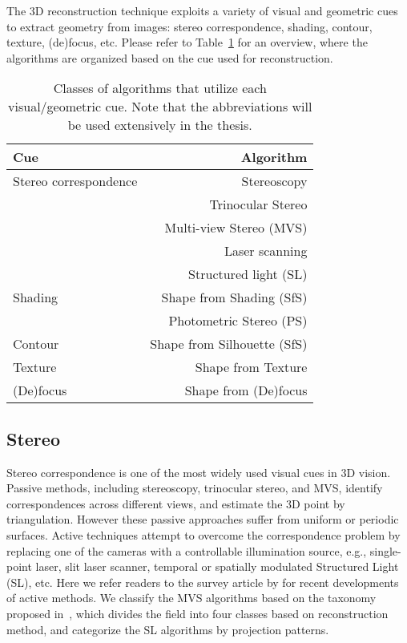 The 3D reconstruction technique exploits a variety of visual and geometric cues to extract geometry from images: stereo correspondence, shading, contour, texture, (de)focus, etc. Please refer to Table~\ref{tab:cue_algo} for an overview, where the algorithms are organized based on the cue used for reconstruction.
\begin{table}[h]
  \centering
  \begin{tabular}{l|r}
  \toprule
  \textbf{Cue} & \textbf{Algorithm}\\
  \midrule
  Stereo correspondence & Stereoscopy\\
  & Trinocular Stereo\\
  & Multi-view Stereo (MVS)\\
  & Laser scanning\\
  & Structured light (SL)\\
  \hline
  Shading & Shape from Shading (SfS)\\
  & Photometric Stereo (PS)\\
  \hline
  Contour & Shape from Silhouette (SfS)\\
  \hline
  Texture & Shape from Texture\\
  \hline
  (De)focus & Shape from (De)focus\\
  \bottomrule
  \end{tabular}
  \caption{Classes of algorithms that utilize each visual/geometric cue. Note that the abbreviations will be used extensively in the thesis.}
  \label{tab:cue_algo}
\end{table}

\subsection{Stereo}
Stereo correspondence is one of the most widely used visual cues in 3D vision. Passive methods, including stereoscopy, trinocular stereo, and MVS, identify correspondences across different views, and estimate the 3D point by triangulation. However these passive approaches suffer from uniform or periodic surfaces. Active techniques attempt to overcome the correspondence problem by replacing one of the cameras with a controllable illumination source, e.g., single-point laser, slit laser scanner, temporal or spatially modulated Structured Light (SL), etc. Here we refer readers to the survey article by \citeauthor{blais2004review} for recent developments of active methods. We classify the MVS algorithms based on the taxonomy proposed in~\cite{seitz2006comparison}, which divides the field into four classes based on reconstruction method, and categorize the SL algorithms by projection patterns.


